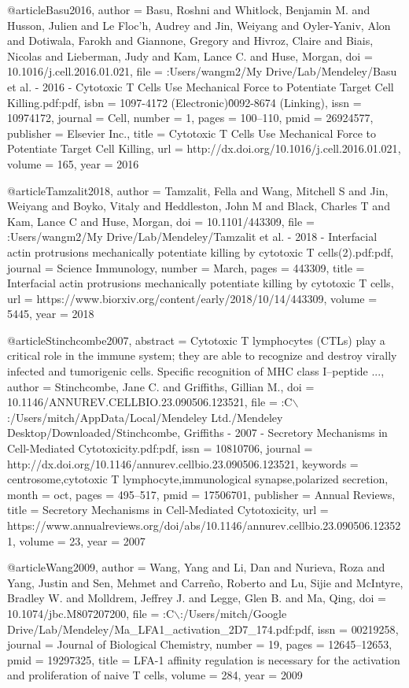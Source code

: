 @article{Basu2016,
author = {Basu, Roshni and Whitlock, Benjamin M. and Husson, Julien and {Le Floc'h}, Audrey and Jin, Weiyang and Oyler-Yaniv, Alon and Dotiwala, Farokh and Giannone, Gregory and Hivroz, Claire and Biais, Nicolas and Lieberman, Judy and Kam, Lance C. and Huse, Morgan},
doi = {10.1016/j.cell.2016.01.021},
file = {:Users/wangm2/My Drive/Lab/Mendeley/Basu et al. - 2016 - Cytotoxic T Cells Use Mechanical Force to Potentiate Target Cell Killing.pdf:pdf},
isbn = {1097-4172 (Electronic)\r0092-8674 (Linking)},
issn = {10974172},
journal = {Cell},
number = {1},
pages = {100--110},
pmid = {26924577},
publisher = {Elsevier Inc.},
title = {{Cytotoxic T Cells Use Mechanical Force to Potentiate Target Cell Killing}},
url = {http://dx.doi.org/10.1016/j.cell.2016.01.021},
volume = {165},
year = {2016}
}

@article{Tamzalit2018,
author = {Tamzalit, Fella and Wang, Mitchell S and Jin, Weiyang and Boyko, Vitaly and Heddleston, John M and Black, Charles T and Kam, Lance C and Huse, Morgan},
doi = {10.1101/443309},
file = {:Users/wangm2/My Drive/Lab/Mendeley/Tamzalit et al. - 2018 - Interfacial actin protrusions mechanically potentiate killing by cytotoxic T cells(2).pdf:pdf},
journal = {Science Immunology},
number = {March},
pages = {443309},
title = {{Interfacial actin protrusions mechanically potentiate killing by cytotoxic T cells}},
url = {https://www.biorxiv.org/content/early/2018/10/14/443309},
volume = {5445},
year = {2018}
}

@article{Stinchcombe2007,
abstract = {Cytotoxic T lymphocytes (CTLs) play a critical role in the immune system; they are able to recognize and destroy virally infected and tumorigenic cells. Specific recognition of MHC class I–peptide ...},
author = {Stinchcombe, Jane C. and Griffiths, Gillian M.},
doi = {10.1146/ANNUREV.CELLBIO.23.090506.123521},
file = {:C$\backslash$:/Users/mitch/AppData/Local/Mendeley Ltd./Mendeley Desktop/Downloaded/Stinchcombe, Griffiths - 2007 - Secretory Mechanisms in Cell-Mediated Cytotoxicity.pdf:pdf},
issn = {10810706},
journal = {http://dx.doi.org/10.1146/annurev.cellbio.23.090506.123521},
keywords = {centrosome,cytotoxic T lymphocyte,immunological synapse,polarized secretion},
month = {oct},
pages = {495--517},
pmid = {17506701},
publisher = {Annual Reviews},
title = {{Secretory Mechanisms in Cell-Mediated Cytotoxicity}},
url = {https://www.annualreviews.org/doi/abs/10.1146/annurev.cellbio.23.090506.123521},
volume = {23},
year = {2007}
}

@article{Wang2009,
author = {Wang, Yang and Li, Dan and Nurieva, Roza and Yang, Justin and Sen, Mehmet and Carre{\~{n}}o, Roberto and Lu, Sijie and McIntyre, Bradley W. and Molldrem, Jeffrey J. and Legge, Glen B. and Ma, Qing},
doi = {10.1074/jbc.M807207200},
file = {:C$\backslash$:/Users/mitch/Google Drive/Lab/Mendeley/Ma{\_}LFA1{\_}activation{\_}2D7{\_}174.pdf:pdf},
issn = {00219258},
journal = {Journal of Biological Chemistry},
number = {19},
pages = {12645--12653},
pmid = {19297325},
title = {{LFA-1 affinity regulation is necessary for the activation and proliferation of naive T cells}},
volume = {284},
year = {2009}
}
